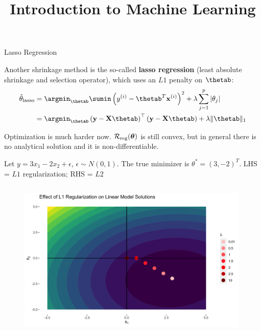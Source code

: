 \documentclass[11pt,compress,t,notes=noshow, xcolor=table]{beamer}
\title{Introduction to Machine Learning}
\begin{document}



\begin{vbframe}{Lasso Regression}

Another shrinkage method is the so-called \textbf{lasso regression} ({\scriptsize{least absolute shrinkage and selection operator}}), which uses an $L1$ penalty on $\thetab$:
\vspace{0.4cm}
\begin{align*}
\thetah_{\text{lasso}}&= \argmin_{\thetab} \sumin \left(\yi - \thetab^T \xi\right)^2 + \lambda \sum_{j=1}^{p} \vert\theta_j\vert\\
&= \argmin_{\thetab}\left(\yv - \Xmat \thetab\right)^\top \left(\yv - \Xmat \thetab\right) + \lambda \|\thetab\|_1
\end{align*}

\vspace{0.4cm}

Optimization is much harder now. $\mathcal{R}_{\text{reg}}(\bm{\theta})$ is still convex, but in general there is no analytical solution and it is non-differentiable.\\
\vspace{0.2cm}


\framebreak

Let $y=3x_{1} -2x_{2} +\epsilon $, $ \epsilon \sim N( 0,1)$. The true minimizer is $\theta ^{*} =( 3,-2)^{T}$. 
LHS = $L1$ regularization; RHS = $L2$
\begin{columns}
\begin{column}{0.5\textwidth}
\lz
\begin{figure}
\includegraphics[width=0.99\textwidth]{figure/lin_reg_l1.png}
\end{figure}
\end{column}


\end{columns}
\end{vbframe}
\end{document}
